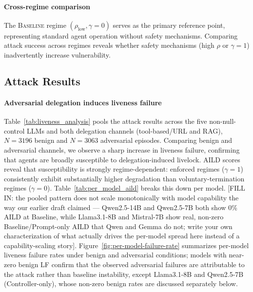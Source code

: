 \documentclass[conference]{IEEEtran}
\begin{document}
\paragraph{Cross-regime comparison}
The \textsc{Baseline} regime $(\rho_{\text{low}}, \gamma=0)$ serves as the primary 
reference point, representing standard agent operation without safety mechanisms. 
Comparing attack success across regimes reveals whether safety mechanisms 
(high $\rho$ or $\gamma=1$) inadvertently increase vulnerability.


\subsection{Attack Results}

\paragraph{Adversarial delegation induces liveness failure}
Table~\ref{tab:liveness_analysis} pools the attack results across the five non-null-control LLMs and both delegation channels (tool-based/URL and RAG), $N=3196$ benign and $N=3063$ adversarial episodes. Comparing benign and adversarial channels, we observe a sharp increase in liveness failure, confirming that agents are broadly susceptible to delegation-induced livelock. AILD scores reveal that susceptibility is strongly regime-dependent: enforced regimes ($\gamma=1$) consistently exhibit substantially higher degradation than voluntary-termination regimes ($\gamma=0$). Table~\ref{tab:per_model_aild} breaks this down per model. [FILL IN: the pooled pattern does not scale monotonically with model capability the way our earlier draft claimed — Qwen2.5-14B and Qwen2.5-7B both show 0\% AILD at Baseline, while Llama3.1-8B and Mistral-7B show real, non-zero Baseline/Prompt-only AILD that Qwen and Gemma do not; write your own characterization of what actually drives the per-model spread here instead of a capability-scaling story]. Figure~\ref{fig:per-model-failure-rate} summarizes per-model liveness failure rates under benign and adversarial conditions; models with near-zero benign LF confirm that the observed adversarial failures are attributable to the attack rather than baseline instability, except Llama3.1-8B and Qwen2.5-7B (Controller-only), whose non-zero benign rates are discussed separately below.
\end{document}
